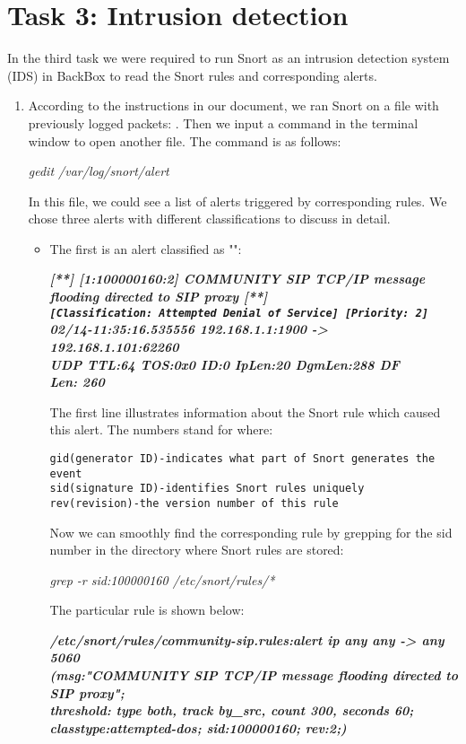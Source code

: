 \section*{Task 3: Intrusion detection}
In the third task we were required to run Snort as an intrusion detection system (IDS)\cite{snort} in BackBox to read the Snort rules and corresponding alerts.
\begin{enumerate}
\item %
According to the instructions in our document, we ran Snort on a file with previously logged packets: . Then we input a command in the terminal window to open another file. The command is as follows:

\textit{gedit /var/log/snort/alert}

In this file, we could see a list of alerts triggered by corresponding rules. We chose three alerts with different classifications to discuss in detail.
\begin{itemize}
\item The first is an alert classified as "":

{\bfseries{\textit{[**] [1:100000160:2] COMMUNITY SIP TCP/IP message flooding directed to SIP proxy [**]\\\lstinline{[Classification: Attempted Denial of Service] [Priority: 2]}\\02/14-11:35:16.535556 192.168.1.1:1900 -> 192.168.1.101:62260\\UDP TTL:64 TOS:0x0 ID:0 IpLen:20 DgmLen:288 DF\\Len: 260}}}

The first line illustrates information about the Snort rule which caused this alert. The numbers  stand for  where:

\lstinline{gid(generator ID)-indicates what part of Snort generates the event}\\\lstinline{sid(signature ID)-identifies Snort rules uniquely}\\\lstinline{rev(revision)-the version number of this rule}

Now we can smoothly find the corresponding rule by grepping for the sid number in the directory where Snort rules are stored:

\textit{grep -r sid:100000160 /etc/snort/rules/*}

The particular rule is shown below:

{\bfseries{\textit{/etc/snort/rules/community-sip.rules:alert ip any any -> any 5060\\(msg:"COMMUNITY SIP TCP/IP message flooding directed to SIP proxy";\\threshold: type both, track by\_src, count 300, seconds 60; classtype:attempted-dos; sid:100000160; rev:2;)}}}


\end{itemize}
\end{enumerate}
